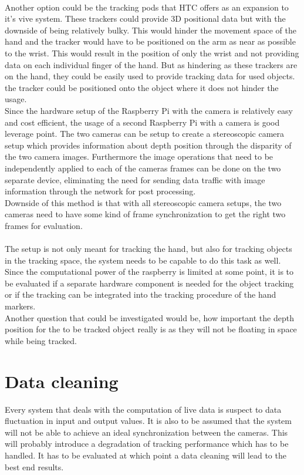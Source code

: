 \\Another option could be the tracking  pods that HTC offers as an expansion to it's vive system. These trackers could provide 3D positional data but with the downside of being relatively bulky. This would hinder the movement space of the hand and the tracker would have to be positioned on the arm as near as possible to the wrist. This would result in the position of only the wrist and not providing data on each individual finger of the hand. But as hindering as these trackers are on the hand, they could be easily used to provide tracking data for used objects. the tracker could be positioned onto the object where it does not hinder the usage. \\
Since the hardware setup of the Raspberry Pi with the camera is relatively easy and cost efficient, the usage of a second Raspberry Pi with a camera is good leverage point. The two cameras can be setup to create a stereoscopic camera setup which provides information about depth position through the disparity of the two camera images. 
Furthermore the image operations that need to be independently applied to each of the cameras frames can be done on the two separate device, eliminating the need for sending data traffic with image information through the network for post processing.
\\Downside of this method is that with all stereoscopic camera setups, the two cameras need to have some kind of frame synchronization to get the right two frames for evaluation.
\\\\The setup is not only meant for tracking the hand, but also for tracking objects in the tracking space, the system needs to be capable to do this task as well. Since the computational power of the raspberry is limited at some point, it is to be evaluated if a separate hardware component is needed for the object tracking or if the tracking can be integrated into the tracking procedure of the hand markers.\\ Another question that could be investigated would be, how important the depth position for the to be tracked object really is as they will not be floating in space while being tracked.
\section{Data cleaning}
Every system that deals with the computation of live data is suspect to data fluctuation in input and output values. It is also to be assumed that the system will not be able to achieve an ideal synchronization between the cameras. This will probably introduce a degradation of tracking performance which has to be handled. It has to be evaluated at which point a data cleaning will lead to the best end results.
